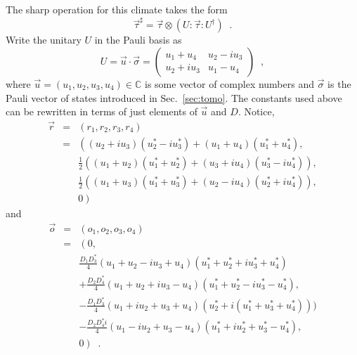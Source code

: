 The sharp operation for this climate takes the form
$$
\vec{\tau}^\sharp = \vec{\tau}\otimes \left(U:\vec{\tau}:U^\dagger\right)\;\;.
$$
Write the unitary $U$ in the Pauli basis as
$$
U=\vec{u}\cdot\vec{\sigma} = \begin{pmatrix}
u_1+u_4&u_2-iu_3\\
u_2+iu_3&u_1-u_4
\end{pmatrix}\;\;,
$$
where $\vec{u}=(u_1,u_2,u_3,u_4)\in\mathbb{C}$ is some vector of complex numbers and $\vec{\sigma}$ is the Pauli vector of states introduced in Sec.\ \ref{sec:tomo}.  The constants used above can be rewritten in terms of just elements of $\vec{u}$ and $D$.  Notice,
\begin{eqnarray*}
\vec{r} &=& (r_1,r_2,r_3,r_4)\\
&=& \left((u_2+iu_3)(u_2^*-iu_3^*)+(u_1+u_4) (u_1^*+u_4^*),\right.\\
& & \frac{1}{2} \left((u_1+u_2) (u_1^*+u_2^*)+(u_3+i u_4) (u_3^*-i u_4^*)\right),\\
& & \frac{1}{2} \left((u_1 + u_3) (u_1^* + u_3^*) + (u_2 - i u_4) (u_2^* + i u_4^*)\right),\\
& & \left. 0 \right)
\end{eqnarray*}
and
\begin{eqnarray*}
\vec{o} &=& (o_1,o_2,o_3,o_4)\\
&=& \left( 0,\right.\\
& & \frac{D_1 D_3^*}{4} \left(u_1 + u_2 - i u_3 + u_4\right) \left(u_1^* + u_2^* + i u_3^* + u_4^*\right)\\
& &+\frac{D_2D_4^*}{4} \left(u_1 + u_2 + i u_3 - u_4\right) \left(u_1^* + u_2^* - i u_3^* -u_4^*\right),\\
& & -\frac{D_1 D_3^*}{4} \left(u_1 + i u_2 + u_3 + u_4\right) \left(u_2^* + i (u_1^* + u_3^* + u_4^*)\right))\\
& &-\frac{D_2D_4^*i}{4} \left(u_1 - i u_2 + u_3 - u_4\right) \left(u_1^* + i u_2^* + u_3^* -u_4^*\right),\\
& &\left. 0 \right)\;\;.
\end{eqnarray*}

